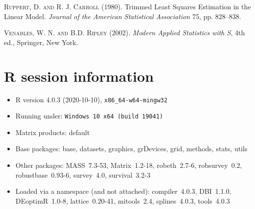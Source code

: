 \documentclass[a4paper,oneside,11pt,DIV=12]{scrartcl}
\begin{document}
\begin{thebibliography}{14}
    \textsc{Ruppert, D. and R. J. Carroll} (1980).
    Trimmed Least Squares Estimation in the Linear Model.
    \emph{Journal of the American Statistical Association} 75,
    pp. 828--838.

    \textsc{Venables, W. N. and B.D. Ripley} (2002).
    \emph{Modern Applied Statistics with S},
    4th ed., Springer, New York.
\end{thebibliography}

\appendix

\section{R session information}
\begin{itemize}\raggedright
  \item R version 4.0.3 (2020-10-10), \verb|x86_64-w64-mingw32|
  \item Running under: \verb|Windows 10 x64 (build 19041)|
  \item Matrix products: default
  \item Base packages: base, datasets, graphics, grDevices, grid,
    methods, stats, utils
  \item Other packages: MASS~7.3-53, Matrix~1.2-18, robeth~2.7-6,
    robsurvey~0.2, robustbase~0.93-6, survey~4.0, survival~3.2-3
  \item Loaded via a namespace (and not attached): compiler~4.0.3,
    DBI~1.1.0, DEoptimR~1.0-8, lattice~0.20-41, mitools~2.4,
    splines~4.0.3, tools~4.0.3
\end{itemize}
\end{document}
